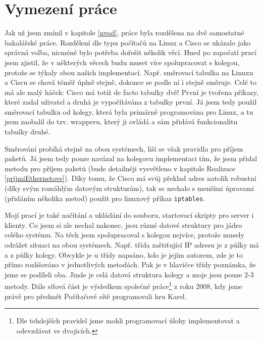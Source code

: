 \section{Vymezení práce} \label{vymezeni}
Jak už jsem zmínil v kapitole \ref{uvod}, práce byla rozdělena na dvě samostatné bakalářské práce. Rozdělení dle typu počítačů na Linux a Cisco se ukázalo jako správná volba, nicméně bylo potřeba dořešit několik věcí. Hned po započatí prací jsem zjistil, že v některých věcech budu muset více spolupracovat s kolegou, protože se týkaly obou našich implementací. Např. směrovací tabulka na Linuxu a Ciscu se chová téměř úplně stejně, dokonce se podle ní i stejně směruje. Celé to má ale malý háček: Cisco má totiž de facto tabulky dvě! První je tvořena příkazy, které zadal uživatel a druhá je vypočítávána z tabulky první. Já jsem tedy použil směrovací tabulku od kolegy, která byla primárně programována pro Linux, a tu jsem zaobalil do tzv. wrapperu, který ji ovládá a sám přidává funkcionalitu tabulky druhé. 

Směrování probíhá stejně na obou systémech, liší se však pravidla pro příjem paketů. Já jsem tedy pouze navázal na kolegovu implementaci tím, že jsem přidal metodu pro příjem paketů (bude detailněji vysvětleno v kapitole Realizace \ref{prijmiEthernetove}). Díky tomu, že Cisco má svůj překlad adres natolik robustní (díky svým rozsáhlým datovým strukturám), tak se nechalo s menšími úpravami (přidáním několika metod) použít pro linuxový příkaz \verb|iptables|. 

Mojí prací je také načítání a ukládání do souboru, startovací skripty pro server i klienty. Co jsem si ale nechal nakonec, jsou různé datové struktury pro jádro celého systému. Na těch jsem spolupracoval s kolegou nejvíce, protože musely odrážet situaci na obou systémech. Např. třída zaštiťující IP adresu je z půlky má a z půlky kolegy. Obvykle je u třídy napsáno, kdo je jejím autorem, zde je to přímo rozlišováno v jednotlivých metodách. Pak je v hlavičce třídy poznámka, že jsme se podíleli oba. Jinde je celá datová struktura kolegy a moje jsou pouze 2-3 metody. Dále síťová část je výsledkem společné práce\footnote{Dle tehdejších pravidel jsme mohli programovací úlohy implementovat a odevzdávat ve dvojicích.} z roku 2008, kdy jsme právě pro předmět Počítačové sítě programovali hru Karel.










